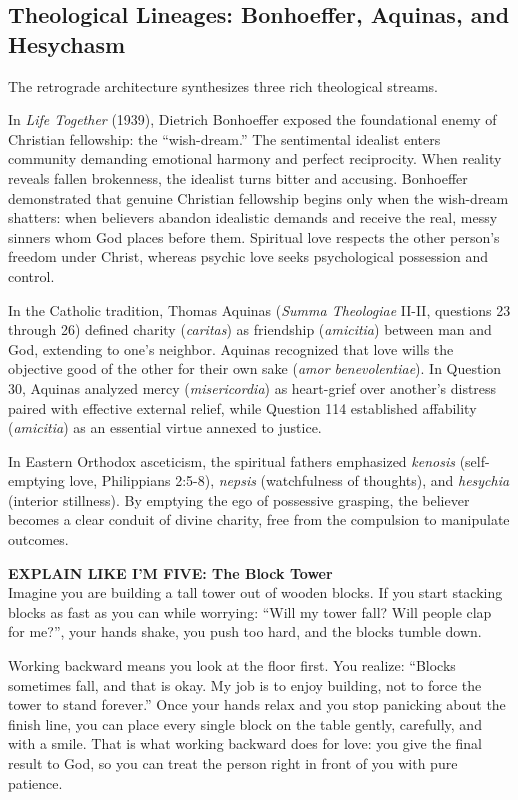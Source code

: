 \documentclass[11pt,twocolumn]{article}
\begin{document}
\subsection{Theological Lineages: Bonhoeffer, Aquinas, and Hesychasm}
The retrograde architecture synthesizes three rich theological streams.

In \textit{Life Together} (1939), Dietrich Bonhoeffer exposed the foundational enemy of Christian fellowship: the ``wish-dream.'' The sentimental idealist enters community demanding emotional harmony and perfect reciprocity. When reality reveals fallen brokenness, the idealist turns bitter and accusing. Bonhoeffer demonstrated that genuine Christian fellowship begins only when the wish-dream shatters: when believers abandon idealistic demands and receive the real, messy sinners whom God places before them. Spiritual love respects the other person's freedom under Christ, whereas psychic love seeks psychological possession and control.

In the Catholic tradition, Thomas Aquinas (\textit{Summa Theologiae} II-II, questions 23 through 26) defined charity (\textit{caritas}) as friendship (\textit{amicitia}) between man and God, extending to one's neighbor. Aquinas recognized that love wills the objective good of the other for their own sake (\textit{amor benevolentiae}). In Question 30, Aquinas analyzed mercy (\textit{misericordia}) as heart-grief over another's distress paired with effective external relief, while Question 114 established affability (\textit{amicitia}) as an essential virtue annexed to justice.

In Eastern Orthodox asceticism, the spiritual fathers emphasized \textit{kenosis} (self-emptying love, Philippians 2:5-8), \textit{nepsis} (watchfulness of thoughts), and \textit{hesychia} (interior stillness). By emptying the ego of possessive grasping, the believer becomes a clear conduit of divine charity, free from the compulsion to manipulate outcomes.

\begin{eli5box}
\textbf{EXPLAIN LIKE I'M FIVE: The Block Tower}\\
Imagine you are building a tall tower out of wooden blocks. If you start stacking blocks as fast as you can while worrying: ``Will my tower fall? Will people clap for me?'', your hands shake, you push too hard, and the blocks tumble down. 

Working backward means you look at the floor first. You realize: ``Blocks sometimes fall, and that is okay. My job is to enjoy building, not to force the tower to stand forever.'' Once your hands relax and you stop panicking about the finish line, you can place every single block on the table gently, carefully, and with a smile. That is what working backward does for love: you give the final result to God, so you can treat the person right in front of you with pure patience.
\end{eli5box}
\end{document}
